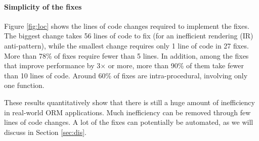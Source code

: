 \paragraph{\bf Simplicity of the fixes}
Figure \ref{fig:loc} shows the lines of code changes required to implement the fixes. 
The biggest change takes 56 lines of code to fix (for an inefficient rendering (IR) anti-pattern), while the smallest change requires only 1 line of code in 27 fixes. More than 78\% of fixes require fewer than 5 lines. In addition, among the fixes that improve performance by 3$\times$ or more, more than 90\% of them take fewer than 10 lines of code. Around 60\% of fixes are intra-procedural, involving only one function.  

These results quantitatively show that there is still a huge amount of inefficiency in 
real-world ORM applications. Much inefficiency can be removed through few lines of code changes.
 A lot of the fixes can potentially be automated, as we will discuss in Section \ref{sec:dis}.

